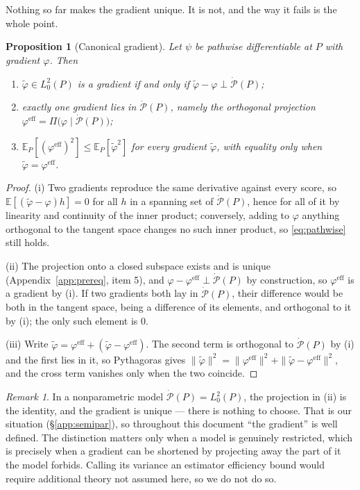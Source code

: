 \documentclass[11pt,a4paper]{article}
\theoremstyle{plain}
\newtheorem{proposition}[theorem]{Proposition}
\theoremstyle{definition}
\theoremstyle{remark}
\newtheorem*{remark*}{Remark}
\newcommand{\E}{\mathbb E}
\begin{document}
Nothing so far makes the gradient unique. It is not, and the way it fails is the whole point.

\begin{proposition}[Canonical gradient]\label{prop:canonical}
Let $\psi$ be pathwise differentiable at $P$ with gradient $\varphi$. Then
\begin{enumerate}[leftmargin=*,label=(\roman*)]
\item $\tilde\varphi\in L^2_0(P)$ is a gradient if and only if
$\tilde\varphi-\varphi\perp\dot{\mathcal P}(P)$;
\item exactly one gradient lies in $\dot{\mathcal P}(P)$, namely the orthogonal projection
$\varphi^{\mathrm{eff}}=\Pi\bigl(\varphi\mid\dot{\mathcal P}(P)\bigr)$;
\item $\E_P[(\varphi^{\mathrm{eff}})^2]\le\E_P[\tilde\varphi^2]$ for every gradient
$\tilde\varphi$, with equality only when $\tilde\varphi=\varphi^{\mathrm{eff}}$.
\end{enumerate}
\end{proposition}

\begin{proof}
(i) Two gradients reproduce the same derivative against every score, so
$\E[(\tilde\varphi-\varphi)h]=0$ for all $h$ in a spanning set of $\dot{\mathcal P}(P)$, hence
for all of it by linearity and continuity of the inner product; conversely, adding to $\varphi$
anything orthogonal to the tangent space changes no such inner product, so \eqref{eq:pathwise}
still holds.

(ii) The projection onto a closed subspace exists and is unique (Appendix~\ref{app:prereq}, item
5), and $\varphi-\varphi^{\mathrm{eff}}\perp\dot{\mathcal P}(P)$ by construction, so
$\varphi^{\mathrm{eff}}$ is a gradient by (i). If two gradients both lay in
$\dot{\mathcal P}(P)$, their difference would be both in the tangent space, being a difference of
its elements, and orthogonal to it by (i); the only such element is $0$.

(iii) Write $\tilde\varphi=\varphi^{\mathrm{eff}}+(\tilde\varphi-\varphi^{\mathrm{eff}})$. The
second term is orthogonal to $\dot{\mathcal P}(P)$ by (i) and the first lies in it, so Pythagoras
gives $\|\tilde\varphi\|^2=\|\varphi^{\mathrm{eff}}\|^2+\|\tilde\varphi-\varphi^{\mathrm{eff}}\|^2$,
and the cross term vanishes only when the two coincide.
\end{proof}

\begin{remark*}
In a nonparametric model $\dot{\mathcal P}(P)=L^2_0(P)$, the projection in (ii) is the identity,
and the gradient is unique --- there is nothing to choose. That is our situation
(\S\ref{app:semipar}), so throughout this document ``the gradient'' is well defined. The
distinction matters only when a model is genuinely restricted, which is precisely when a
gradient can be shortened by projecting away the part of it the model forbids. Calling its
variance an estimator efficiency bound would require additional theory not assumed here, so we
do not do so.
\end{remark*}
\end{document}
